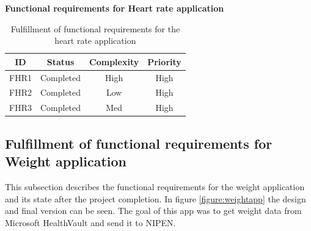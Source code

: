\textbf{Functional requirements for Heart rate application}

\begin{table}[H]
\begin{center}
\begin{tabular}{ | c | c | c | c |}
  \hline
  \textbf{ID} & \textbf{Status} & \textbf{Complexity} & \textbf{Priority} \\
  \hline\noalign{\smallskip}\hline
  FHR1	& Completed & High & High \\
  FHR2	& Completed & Low  & High \\
  FHR3	& Completed & Med  & High \\
  \hline
\end{tabular}
\end{center}
\caption{Fulfillment of functional requirements for the heart rate application}
\label{table:fulfillemntofapp}
\end{table}

\iffalse
\subsection{Fulfillment of functional requirements for Weight application}

This subsection describes the functional requirements for the weight application and its state after the project completion.
In figure \ref{figure:weightapp} the design and final version can be seen.
The goal of this app was to get weight data from Microsoft HealthVault and send it to NIPEN.

